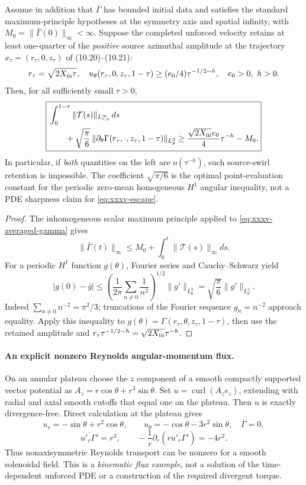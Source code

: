 \begin{theorem}
\label{thm:xxxv-dichotomy}
Assume in addition that $\bar\Gamma$ has bounded initial
data and satisfies the standard maximum-principle hypotheses
at the symmetry axis and spatial infinity, with
$M_0=\|\bar\Gamma(0)\|_\infty<\infty$.
Suppose the completed unforced velocity
retains at least one-quarter of the \emph{positive}
source azimuthal amplitude at the trajectory
$x_\tau=(r_\tau,0,z_\tau)$ of (10.20)--(10.21):
\[
r_\tau=\sqrt{2X_{\rm in}\tau},\quad
u_\theta(r_\tau,0,z_\tau,1-\tau)
\ge(e_0/4)\tau^{-1/2-h},
\quad e_0>0,\ h>0.
\]
Then, for all sufficiently small $\tau>0$,
\begin{equation}\label{eq:xxxv-escape}
\boxed{\begin{aligned}
&\int_0^{1-\tau}
 \|\mathcal T(s)\|_{L^\infty_{r,z}}\,ds\\
&\qquad+\sqrt{\frac{\pi}{6}}\,
 \|\partial_\theta\Gamma(r_\tau,\cdot,z_\tau,1-\tau)\|_{L^2_\theta}
\ge \frac{\sqrt{2X_{\rm in}}e_0}{4}\tau^{-h}-M_0.
\end{aligned}}
\end{equation}
In particular, if \emph{both} quantities on the left
are $o(\tau^{-h})$, such source-swirl retention is impossible.
The coefficient $\sqrt{\pi/6}$ is the optimal
point-evaluation constant for the periodic zero-mean
homogeneous $H^1$ angular inequality, not a PDE
sharpness claim for \eqref{eq:xxxv-escape}.
\end{theorem}
\begin{proof}
The inhomogeneous scalar maximum principle applied to
\eqref{eq:xxxv-averaged-gamma} gives
\[
\|\bar\Gamma(t)\|_\infty\le
M_0+\int_0^t\|\mathcal T(s)\|_\infty ds.
\]
For a periodic $H^1$ function $g(\theta)$, Fourier series
and Cauchy--Schwarz yield
\[
|g(0)-\bar g|
\le \left(
 \frac1{2\pi}\sum_{n\ne0}\frac1{n^2}
 \right)^{1/2}\|g'\|_{L^2_\theta}
=\sqrt{\frac{\pi}{6}}\|g'\|_{L^2_\theta}.
\]
Indeed $\sum_{n\ne0}n^{-2}=\pi^2/3$;
truncations of the Fourier sequence $g_n=n^{-2}$
approach equality. Apply this inequality to
$g(\theta)=\Gamma(r_\tau,\theta,z_\tau,1-\tau)$,
then use the retained amplitude and
$r_\tau\tau^{-1/2-h}
=\sqrt{2X_{\rm in}}\tau^{-h}$.
\end{proof}

\paragraph{An explicit nonzero Reynolds angular-momentum flux.}
On an annular plateau choose the $z$ component
of a smooth compactly supported vector potential
as $A_z=r\cos\theta+r^3\sin\theta$.
Set $u=\operatorname{curl}(A_ze_z)$, extending
with radial and axial smooth cutoffs that equal one
on the plateau. Then $u$ is exactly divergence-free.
Direct calculation at the plateau gives
\[
u_r=-\sin\theta+r^2\cos\theta,\qquad
u_\theta=-\cos\theta-3r^2\sin\theta,
\quad\bar\Gamma=0,
\]
\[
\overline{u'_r\Gamma'}=r^3,\qquad
-\frac1r\partial_r(r\overline{u'_r\Gamma'})=-4r^2.
\]
Thus nonaxisymmetric Reynolds transport can be
nonzero for a smooth solenoidal field. This is a
\emph{kinematic flux example}, not a solution of
the time-dependent unforced PDE or a construction
of the required divergent torque.

